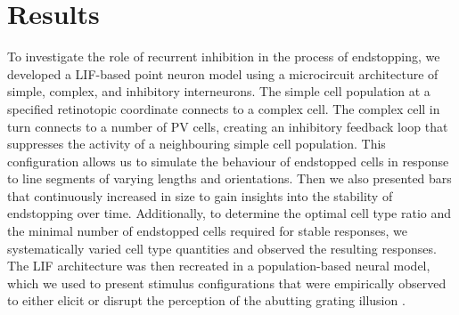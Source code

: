 \documentclass[12pt]{article}
\begin{document}
\section*{Results}
\setlength{\parindent}{24pt}
To investigate the role of recurrent inhibition in the process of endstopping, we developed a LIF-based point neuron model using a microcircuit architecture of simple, complex, and inhibitory interneurons. The simple cell population at a specified retinotopic coordinate connects to a complex cell. The complex cell in turn connects to a number of PV cells, creating an inhibitory feedback loop that suppresses the activity of a neighbouring simple cell population. This configuration allows us to simulate the behaviour of endstopped cells in response to line segments of varying lengths and orientations. Then we also presented bars that continuously increased in size to gain insights into the stability of endstopping over time. Additionally, to determine the optimal cell type ratio and the minimal number of endstopped cells required for stable responses, we systematically varied cell type quantities and observed the resulting responses. The LIF architecture was then recreated in a population-based neural model, which we used to present stimulus configurations that were empirically observed to either elicit or disrupt the perception of the abutting grating illusion \autocite{vonderheydtMechanismsContourPerception1989}. 
\setlength{\parindent}{0pt}

\end{document}
